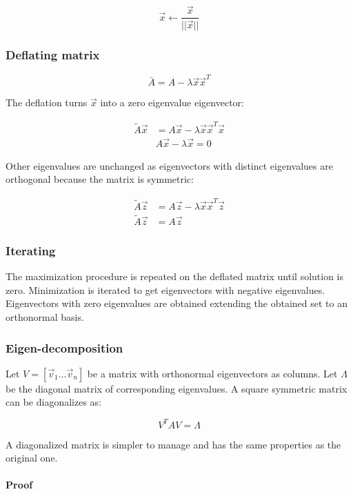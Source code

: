 		$$\vec{x}\leftarrow\frac{\vec{x}}{||\vec{x}||}$$

		\subsubsection{Deflating matrix}

		$$\bar{A} = A - \lambda \vec{x}\vec{x}^T$$

		The deflation turns $\vec{x}$ into a zero eigenvalue eigenvector:

		\begin{align*}
			\tilde{A}\vec{x} &= A\vec{x} -\lambda \vec{x}\vec{x}^T\vec{x}\\
				 &A\vec{x}-\lambda \vec{x} = 0
		\end{align*}

		Other eigenvalues are unchanged as eigenvectors with distinct eigenvalues are orthogonal because the matrix is symmetric:

		\begin{align*}
			\tilde{A}\vec{z} &= A\vec{z}-\lambda \vec{x}\vec{x}^T\vec{z}\\
			\tilde{A}\vec{z} &=A\vec{z}
		\end{align*}

		\subsubsection{Iterating}
		The maximization procedure is repeated on the deflated matrix until solution is zero.
		Minimization is iterated to get eigenvectors with negative eigenvalues.
		Eigenvectors with zero eigenvalues are obtained extending the obtained set to an orthonormal basis.

		\subsubsection{Eigen-decomposition}
		Let $V = [\vec{v}_1 \dots \vec{v}_n]$ be a matrix with orthonormal eigenvectors as columns.
		Let $\Lambda$ be the diagonal matrix of corresponding eigenvalues.
		A square symmetric matrix can be diagonalizes as:

		$$V^TAV=\Lambda$$

		A diagonalized matrix is simpler to manage and has the same properties as the original one.

			\paragraph{Proof}

